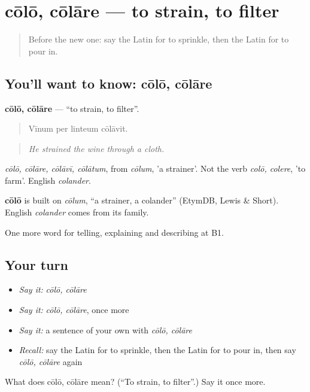 \section[cōlō, cōlāre]{cōlō, cōlāre — to strain, to filter}

\label{lesson:LA-C355-colo}



\begin{quote}
Before the new one: say the Latin for to sprinkle, then the Latin for to pour in.
\end{quote}

\subsection*{You'll want to know: cōlō, cōlāre}
\textbf{cōlō, cōlāre} — \textquotedblleft{}to strain, to filter\textquotedblright{}.

\begin{quote}
Vīnum per linteum cōlāvit.
\end{quote}

\begin{quote}
\emph{He strained the wine through a cloth.}
\end{quote}

\emph{cōlō, cōlāre, cōlāvī, cōlātum}, from \emph{cōlum}, 'a strainer'. Not the verb \emph{colō, colere}, 'to farm'. English \emph{colander}.

\begin{cousinweb}
\textbf{cōlō} is built on \emph{cōlum}, \textquotedblleft{}a strainer, a colander\textquotedblright{} (EtymDB, Lewis \& Short). English \emph{colander} comes from its family.
\end{cousinweb}

\begin{grammarlens}[title={What you've built}]
One more word for telling, explaining and describing at B1.
\end{grammarlens}

\subsection*{Your turn}
\begin{itemize}
\raggedright
  \item \emph{Say it:} \emph{cōlō, cōlāre}
  \item \emph{Say it:} \emph{cōlō, cōlāre}, once more
  \item \emph{Say it:} a sentence of your own with \emph{cōlō, cōlāre}
  \item \emph{Recall:} say the Latin for to sprinkle, then the Latin for to pour in, then say \emph{cōlō, cōlāre} again
\end{itemize}

\begin{tcolorbox}[breakable,colback=teal!4,colframe=teal!35!black,title={Before you move on}]
What does cōlō, cōlāre mean? (\textquotedblleft{}To strain, to filter\textquotedblright{}.) Say it once more.
\end{tcolorbox}
